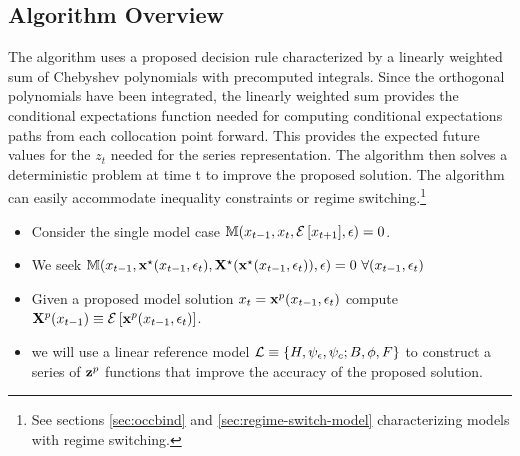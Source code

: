 \documentclass[12pt]{article}
\begin{document}
\subsection{Algorithm Overview}

 \label{sec:unknown-solutions}
The algorithm uses a proposed decision rule characterized by a linearly weighted sum of Chebyshev polynomials with precomputed integrals.  Since the
orthogonal polynomials have been integrated, the linearly weighted sum provides
the conditional expectations function needed for computing conditional expectations paths from each collocation point forward.  This provides the 
expected future values for the $z_t$ needed for the series representation.
The algorithm then solves
a deterministic problem at time t to improve the proposed solution.
The algorithm can easily accommodate inequality
constraints or regime switching.\footnote{See sections \ref{sec:occbind} and \ref{sec:regime-switch-model} characterizing  models with regime switching.}


{
  \begin{itemize}
  \item Consider the single model case $  \mathbb{M}(x_{t-1},x_t,{\mathcal{E}\left [ x_{t+1} \right ]},\epsilon)=0$.  
\item We seek $\mathbb{M}(x_{t-1},\mathbf{x}^\star(x_{t-1},\epsilon_t),\mathbf{X}^\star(\mathbf{x}^\star(x_{t-1},\epsilon_t)),\epsilon)=0\,\,\forall (x_{t-1},\epsilon_t) $
\item Given a proposed model solution $x_t=\mathbf{x}^p(x_{t-1},\epsilon_t)$ compute $\mathbf{X}^p(x_{t-1})\equiv {\mathcal{E}\left [  \mathbf{x}^p(x_{t-1},\epsilon_t)\right ]}$. 
\item we will use a linear reference model ${\mathcal{L}}  \equiv {\{H,\psi_\epsilon,\psi_c;B,\phi,F\}}$ 
to construct a series of $\mathbf{z}^p$ functions that improve the accuracy of the proposed solution.
\end{itemize}
}
\end{document}
